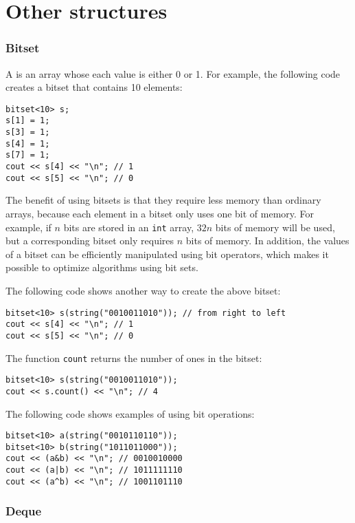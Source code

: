 \section{Other structures}

\subsubsection{Bitset}


A  is an array
whose each value is either 0 or 1.
For example, the following code creates
a bitset that contains 10 elements:
\begin{lstlisting}
bitset<10> s;
s[1] = 1;
s[3] = 1;
s[4] = 1;
s[7] = 1;
cout << s[4] << "\n"; // 1
cout << s[5] << "\n"; // 0
\end{lstlisting}

The benefit of using bitsets is that
they require less memory than ordinary arrays,
because each element in a bitset only
uses one bit of memory.
For example, 
if $n$ bits are stored in an \texttt{int} array,
$32n$ bits of memory will be used,
but a corresponding bitset only requires $n$ bits of memory.
In addition, the values of a bitset
can be efficiently manipulated using
bit operators, which makes it possible to
optimize algorithms using bit sets.

The following code shows another way to create the above bitset:
\begin{lstlisting}
bitset<10> s(string("0010011010")); // from right to left
cout << s[4] << "\n"; // 1
cout << s[5] << "\n"; // 0
\end{lstlisting}

The function \texttt{count} returns the number
of ones in the bitset:

\begin{lstlisting}
bitset<10> s(string("0010011010"));
cout << s.count() << "\n"; // 4
\end{lstlisting}

The following code shows examples of using bit operations:
\begin{lstlisting}
bitset<10> a(string("0010110110"));
bitset<10> b(string("1011011000"));
cout << (a&b) << "\n"; // 0010010000
cout << (a|b) << "\n"; // 1011111110
cout << (a^b) << "\n"; // 1001101110
\end{lstlisting}

\subsubsection{Deque}

